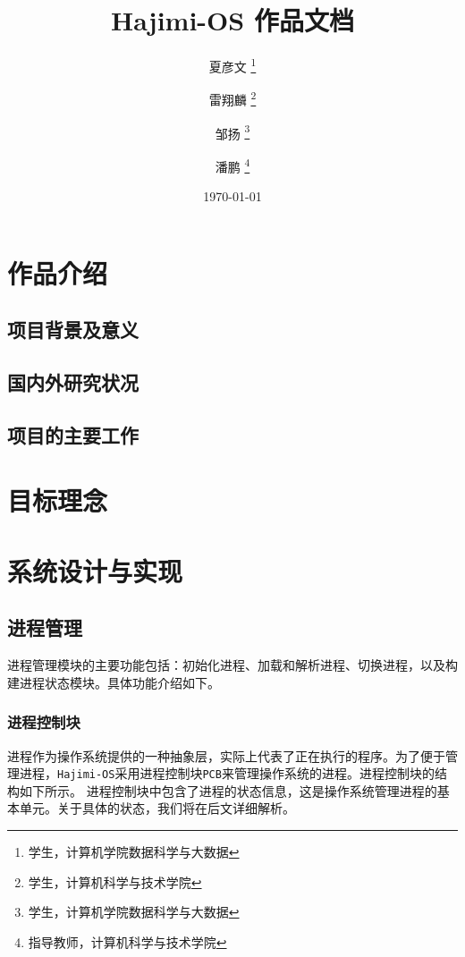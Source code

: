 \documentclass[UTF8]{article}
\begin{document}
\title{\Huge Hajimi-OS 作品文档}
\author{夏彦文 \thanks{学生，计算机学院数据科学与大数据} \and 雷翔麟 \thanks{学生，计算机科学与技术学院}
  \and 邹扬 \thanks{学生，计算机学院数据科学与大数据} \and 潘鹏 \thanks{指导教师，计算机科学与技术学院}}
\date{\today}
\maketitle

\newpage
\tableofcontents
\newpage


\section{作品介绍}
\subsection{项目背景及意义}
\subsection{国内外研究状况}
\subsection{项目的主要工作}

\section{目标理念}

\section{系统设计与实现}
\subsection{进程管理}
进程管理模块的主要功能包括：初始化进程、加载和解析进程、切换进程，以及构建进程状态模块。具体功能介绍如下。
\subsubsection{进程控制块}
进程作为操作系统提供的一种抽象层，实际上代表了正在执行的程序。为了便于管理进程，\texttt{Hajimi-OS}采用进程控制块\texttt{PCB}来管理操作系统的进程。进程控制块的结构如下所示。
进程控制块中包含了进程的状态信息，这是操作系统管理进程的基本单元。关于具体的状态，我们将在后文详细解析。

\end{document}
